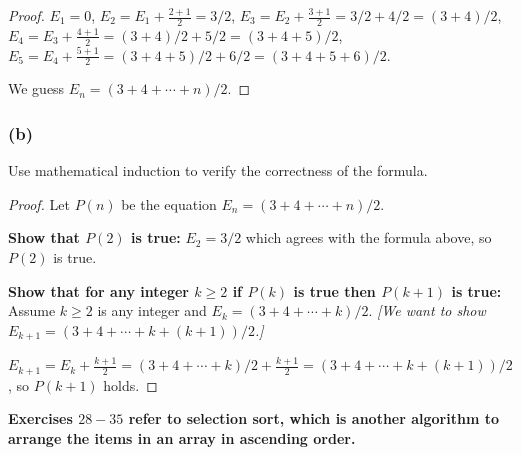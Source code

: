 \documentclass[14pt]{extarticle}
\newcommand{\cy}{\color{cyan}}
\begin{document}
\begin{proof}
    \(E_1 = 0\), \(E_2 = E_1 + \frac{2+1}{2} = 3/2\), \(E_3 = E_2 + \frac{3+1}{2} = 3/2+4/2 = (3+4)/2\), \\
    \(E_4 = E_3 + \frac{4+1}{2} = (3+4)/2 + 5/2 = (3+4+5)/2\), \\
    \(E_5 = E_4 + \frac{5+1}{2} = (3+4+5)/2 + 6/2 = (3+4+5+6)/2\).

    We guess \(E_n = (3+4+\cdots+n)/2\).
\end{proof}

\subsubsection{(b)}
Use mathematical induction to verify the correctness of the formula.

\begin{proof}
    Let \(P(n)\) be the equation \(E_n = (3+4+\cdots+n)/2\).

        {\bf Show that \(P(2)\) is true:} \(E_2 = 3/2\) which agrees with the formula above, so \(P(2)\) is true.

        {\bf Show that for any integer \(k \geq 2\) if \(P(k)\) is true then \(P(k+1)\) is true:} Assume \(k \geq 2\) is any
    integer and \(E_k = (3+4+\cdots+k)/2\). {\it [We want to show \(E_{k+1} = (3+4+\cdots+k+(k+1))/2\).]}

    \(E_{k+1} = E_k + \frac{k+1}{2} = (3+4+\cdots+k)/2 + \frac{k+1}{2} = (3+4+\cdots+k+(k+1))/2\), so \(P(k+1)\) holds.
\end{proof}

{\bf \cy Exercises \(28-35\) refer to selection sort, which is another algorithm to arrange the items in an array in
ascending order.}
\end{document}

